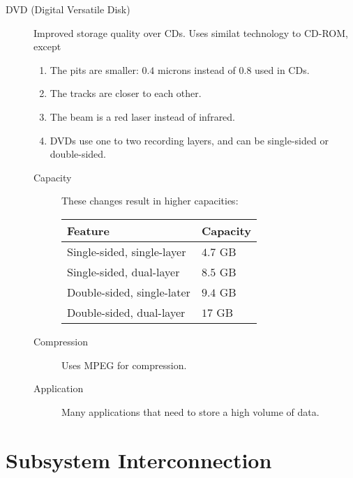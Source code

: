 \documentclass[\main/notes.tex]{subfiles}
\begin{document}
\begin{indentparagraph}
\begin{description}
\begin{description}
								\end{description}
							\pagebreak
							\item[DVD (Digital Versatile Disk)] Improved storage quality over CDs. Uses similat technology to CD-ROM, except
								\begin{enumerate}[label=\alph*, nosep]
									\item The pits are smaller: $0.4$ microns instead of $0.8$ used in CDs.
									\item The tracks are closer to each other.
									\item The beam is a red laser instead of infrared.
									\item DVDs use one to two recording layers, and can be single-sided or double-sided.
								\end{enumerate}
								\begin{description}
									\item[Capacity] These changes result in higher capacities:
										\begin{center}
											\begin{tabular}{ll}
												Feature & Capacity\\
												\midrule
												Single-sided, single-layer & $4.7$ GB\\
												Single-sided, dual-layer & $8.5$ GB\\
												Double-sided, single-later & $9.4$ GB\\
												Double-sided, dual-layer & $17$ GB
											\end{tabular}
										\end{center}
									\item[Compression] Uses MPEG for compression.
									\item[Application] Many applications that need to store a high volume of data.
								\end{description}
						\end{description}
					\end{indentparagraph}
		\section{Subsystem Interconnection}
\end{document}
